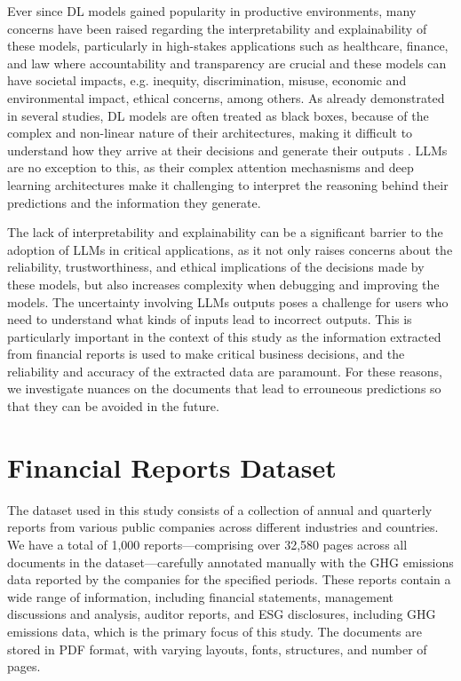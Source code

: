 \documentclass[english, 12pt, a4paper, elec, utf8, a-2b, online]{aaltothesis}
\begin{document}
Ever since \ac{DL} models gained popularity in productive environments, many concerns have been raised regarding the interpretability and explainability of these models, particularly in high-stakes applications such as healthcare, finance, and law where accountability and transparency are crucial and these models can have societal impacts, e.g. inequity, discrimination, misuse, economic and environmental impact, ethical concerns, among others.
As already demonstrated in several studies, \ac{DL} models are often treated as black boxes, because of the complex and non-linear nature of their architectures, making it difficult to understand how they arrive at their decisions and generate their outputs \cite{castelvecchi2016can, 2018_survey_explaining_black_box}.
\ac{LLM}s are no exception to this, as their complex attention mechasnisms and deep learning architectures make it challenging to interpret the reasoning behind their predictions and the information they generate.

The lack of interpretability and explainability can be a significant barrier to the adoption of \ac{LLM}s in critical applications, as it not only raises concerns about the reliability, trustworthiness, and ethical implications of the decisions made by these models, but also increases complexity when debugging and improving the models.
The uncertainty involving \ac{LLM}s outputs poses a challenge for users who need to understand what kinds of inputs lead to incorrect outputs.
This is particularly important in the context of this study as the information extracted from financial reports is used to make critical business decisions, and the reliability and accuracy of the extracted data are paramount.
For these reasons, we investigate nuances on the documents that lead to errouneous predictions so that they can be avoided in the future.

\clearpage

\section{Financial Reports Dataset}
\label{sec:dataset}

The dataset used in this study consists of a collection of annual and quarterly reports from various public companies across different industries and countries.
We have a total of 1,000 reports—comprising over 32,580 pages across all documents in the dataset—carefully annotated manually with the \ac{GHG} emissions data reported by the companies for the specified periods.
These reports contain a wide range of information, including financial statements, management discussions and analysis, auditor reports, and \ac{ESG} disclosures, including \ac{GHG} emissions data, which is the primary focus of this study.
The documents are stored in \ac{PDF} format, with varying layouts, fonts, structures, and number of pages.
\end{document}
